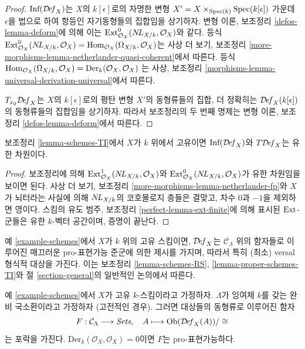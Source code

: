 \begin{proof}
$\text{Inf}(\mathcal{D}\!\mathit{ef}_X)$는 $X$의 $k[\epsilon]$로의 자명한 변형
$X' = X \times_{\mathop{\mathrm{Spec}}(k)} \mathop{\mathrm{Spec}}(k[\epsilon])$ 가운데 $\epsilon$을 법으로 하여
항등인 자기동형들의 집합임을 상기하자. 변형 이론, 보조정리
\ref{defos-lemma-deform}에 의해 이는
$\text{Ext}^0_{\mathcal{O}_X}(\mathop{N\!L}\nolimits_{X/k}, \mathcal{O}_X)$와 같다. 등식
$\text{Ext}^0_{\mathcal{O}_X}(\mathop{N\!L}\nolimits_{X/k}, \mathcal{O}_X) =
\mathop{\mathrm{Hom}}\nolimits_{\mathcal{O}_X}(\Omega_{X/k}, \mathcal{O}_X)$는 사상 더 보기,
보조정리 \ref{more-morphisms-lemma-netherlander-quasi-coherent}에서 따른다.
등식
$\mathop{\mathrm{Hom}}\nolimits_{\mathcal{O}_X}(\Omega_{X/k}, \mathcal{O}_X) =
\text{Der}_k(\mathcal{O}_X, \mathcal{O}_X)$
는 사상, 보조정리 \ref{morphisms-lemma-universal-derivation-universal}에서
따른다.

\medskip\noindent
$T_{x_0}\mathcal{D}\!\mathit{ef}_X$는 $X$의 $k[\epsilon]$로의 평탄 변형 $X'$의
동형류들의 집합, 더 정확히는 $\mathcal{D}\!\mathit{ef}_X(k[\epsilon])$의
동형류들의 집합임을 상기하자. 따라서 보조정리의 두 번째 명제는
변형 이론, 보조정리 \ref{defos-lemma-deform}에서 따른다.
\end{proof}

\begin{lemma}
\label{lemma-proper-schemes-TI}
보조정리 \ref{lemma-schemes-TI}에서 $X$가 $k$ 위에서 고유이면
$\text{Inf}(\mathcal{D}\!\mathit{ef}_X)$와 $T\mathcal{D}\!\mathit{ef}_X$는
유한 차원이다.
\end{lemma}

\begin{proof}
보조정리에 의해 $\mathop{\mathrm{Ext}}\nolimits^1_{\mathcal{O}_X}(\mathop{N\!L}\nolimits_{X/k}, \mathcal{O}_X)$와
$\mathop{\mathrm{Ext}}\nolimits^0_{\mathcal{O}_X}(\mathop{N\!L}\nolimits_{X/k}, \mathcal{O}_X)$가 유한 차원임을
보이면 된다. 사상 더 보기, 보조정리
\ref{more-morphisms-lemma-netherlander-fp}와 $X$가 뇌터라는 사실에 의해
$\mathop{N\!L}\nolimits_{X/k}$의 코호몰로지 층들은 결맞고, 차수 $0$과 $-1$을 제외하면
영이다. 스킴의 유도 범주, 보조정리 \ref{perfect-lemma-ext-finite}에 의해
표시된 $\mathop{\mathrm{Ext}}\nolimits$-군들은 유한 $k$-벡터 공간이며, 증명이 끝난다.
\end{proof}

\noindent
예 \ref{example-schemes}에서 $X$가 $k$ 위의 고유 스킴이면,
$\mathcal{D}\!\mathit{ef}_X$는 $\mathcal{C}_\Lambda$ 위의 함자들로 이루어진
매끄러운 pro-표현가능 준군에 의한 제시를 가지며, 따라서 특히
(최소) versal 형식적 대상을 가진다. 이는 보조정리
\ref{lemma-schemes-RS}, \ref{lemma-proper-schemes-TI}와
절 \ref{section-general}의 일반적인 논의에서 따른다.

\begin{lemma}
\label{lemma-schemes-hull}
예 \ref{example-schemes}에서 $X$가 고유 $k$-스킴이라고 가정하자.
$\Lambda$가 잉여체 $k$를 갖는 완비 국소환이라고 가정하자
(고전적인 경우). 그러면 대상들의 동형류로 이루어진 함자
$$
F : \mathcal{C}_\Lambda \longrightarrow \textit{Sets},\quad
A \longmapsto \mathop{\mathrm{Ob}}\nolimits(\mathcal{D}\!\mathit{ef}_X(A))/\cong
$$
는 포락을 가진다. $\text{Der}_k(\mathcal{O}_X, \mathcal{O}_X) = 0$이면
$F$는 pro-표현가능하다.
\end{lemma}

